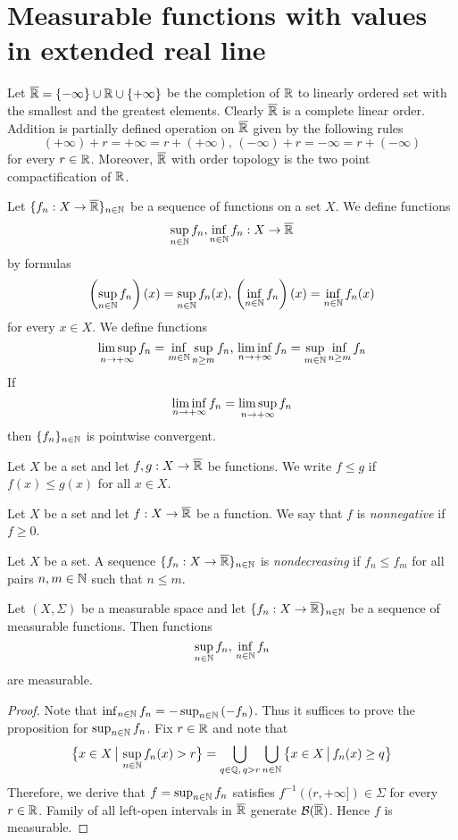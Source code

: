 \section{Measurable functions with values in extended real line}
\noindent
Let $\overline{{\mathbb R}}=\{-\infty\} \cup {\mathbb R} \cup \{+\infty\}$ be the completion of ${\mathbb R}$ to linearly ordered set with the smallest and the greatest elements. Clearly $\overline{{\mathbb R}}$ is a complete linear order. Addition is partially defined operation on $\overline{{\mathbb R}}$ given by the following rules
$$(+\infty)+r=+\infty=r+(+\infty),\,(-\infty)+r=-\infty=r+(-\infty)$$
for every $r\in {\mathbb R}$. Moreover, $\overline{{\mathbb R}}$ with order topology is the two point compactification of ${\mathbb R}$.

Let $\{f_n:X\rightarrow \overline{{\mathbb R}}\}_{n\in {\mathbb N}}$ be a sequence of functions on a set $X$. We define functions
$$\sup_{n\in {\mathbb N}}f_n,\inf_{n\in {\mathbb N}}f_n:X\rightarrow \overline{{\mathbb R}}$$
by formulas
$$\left(\sup_{n\in {\mathbb N}}f_n\right)(x) = \sup_{n\in {\mathbb N}}f_n(x),\,\left(\inf_{n\in {\mathbb N}}f_n\right)(x) = \inf_{n\in {\mathbb N}}f_n(x)$$
for every $x\in X$. We define functions
$$\limsup_{n\rightarrow +\infty}f_n = \inf_{m\in {\mathbb N}}\sup_{n\geq m}f_n,\,\liminf_{n\rightarrow +\infty}f_n = \sup_{m\in {\mathbb N}}\inf_{n\geq m}f_n$$
If
$$\liminf_{n\rightarrow +\infty}f_n = \limsup_{n\rightarrow +\infty}f_n$$
then $\{f_n\}_{n\in {\mathbb N}}$ is pointwise convergent.

Let $X$ be a set and let $f,g:X\rightarrow \overline{{\mathbb R}}$ be functions. We write $f \leq g$ if $f(x) \leq g(x)$ for all $x\in X$.

\begin{definition}
    Let $X$ be a set and let $f:X\rightarrow \overline{{\mathbb R}}$ be a function. We say that $f$ is \textit{nonnegative} if $f \geq 0$.
\end{definition}

\begin{definition}
    Let $X$ be a set. A sequence $\{f_n:X\rightarrow \overline{{\mathbb R}}\}_{n\in {\mathbb N}}$ is \textit{nondecreasing} if $f_n \leq f_m$ for all pairs $n, m\in {\mathbb N}$ such that $n\leq m$.
\end{definition}

\begin{proposition}\label{proposition:measurable_functions_closed_under_supremum}
    Let $(X,\Sigma)$ be a measurable space and let $\{f_n:X\rightarrow \overline{{\mathbb R}}\}_{n\in {\mathbb N}}$ be a sequence of measurable functions. Then functions
    $$\sup_{n\in {\mathbb N}}f_n,\,\inf_{n\in {\mathbb N}}f_n$$
    are measurable.
\end{proposition}
\begin{proof}
    Note that $\inf_{n\in {\mathbb N}}f_n = -\sup_{n\in {\mathbb N}}\left(-f_n\right)$. Thus it suffices to prove the proposition for $\sup_{n\in {\mathbb N}}f_n$. Fix $r \in {\mathbb R}$ and note that
    $$\big\{x\in X\,\big|\,\sup_{n\in {\mathbb N}}f_n(x) > r\big\} = \bigcup_{q\in {\mathbb Q},\,q > r}\bigcup_{n\in {\mathbb N}}\big\{x\in X\,\big|\,f_n(x) \geq q\big\}$$
    Therefore, we derive that $f = \sup_{n\in {\mathbb N}}f_n$ satisfies $f^{-1}\left((r,+
        \infty]\right)\in \Sigma$ for every $r \in {\mathbb R}$. Family of all left-open intervals in $\overline{{\mathbb R}}$ generate ${\mathcal B}(\overline{{\mathbb R}})$. Hence $f$ is measurable.
\end{proof}

